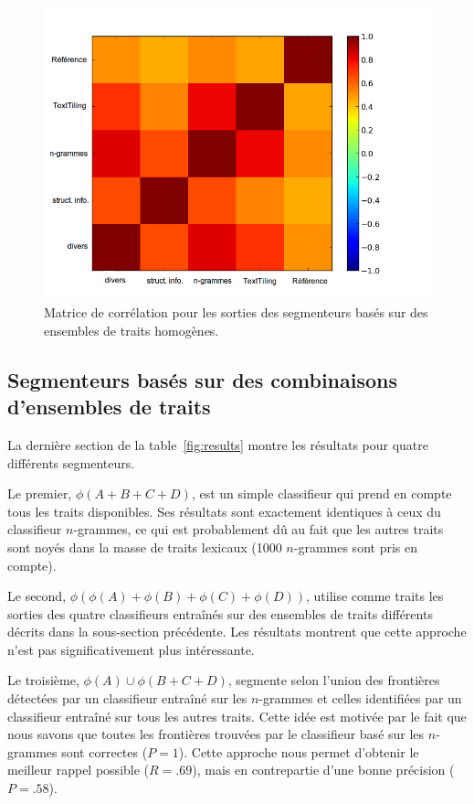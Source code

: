 \begin{figure}[!ht]
	\centering
	\includegraphics[width=.85\textwidth]{img/correlation.png}
	\caption{Matrice de corrélation pour les sorties des segmenteurs basés sur des ensembles de traits homogènes.}
\end{figure}

\subsection{Segmenteurs basés sur des combinaisons d'ensembles de traits}

La dernière section de la table~\ref{fig:results} montre les résultats pour quatre différents segmenteurs. 

Le premier, $\phi(A + B + C + D)$, est un simple classifieur qui prend en compte tous les traits disponibles. Ses résultats sont exactement identiques à ceux du classifieur $n$-grammes, ce qui est probablement dû au fait que les autres traits sont noyés dans la masse de traits lexicaux (1000 $n$-grammes sont pris en compte). 

Le second, $\phi(\phi(A) + \phi(B) + \phi(C) + \phi(D))$, utilise comme traits les sorties des quatre classifieurs entraînés sur des ensembles de traits différents décrits dans la sous-section précédente. Les résultats montrent que cette approche n'est pas significativement plus intéressante. 

Le troisième, $\phi(A) \cup \phi(B + C + D)$, segmente selon l'union des frontières détectées par un classifieur entraîné sur les $n$-grammes et celles identifiées par un classifieur entraîné sur tous les autres traits. Cette idée est motivée par le fait que nous savons que toutes les frontières trouvées par le classifieur basé sur les $n$-grammes sont correctes ($P=1$). Cette approche nous permet d'obtenir le meilleur rappel possible ($R=.69$), mais en contrepartie d'une bonne précision ($P=.58$). 


